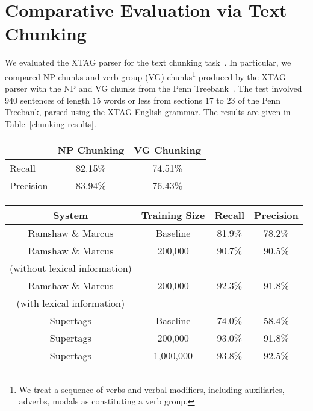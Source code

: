 \section{Comparative Evaluation via Text Chunking}

We evaluated the XTAG parser for the text chunking
task~\cite{abney91}. In particular, we compared NP chunks and verb
group (VG) chunks\footnote{We treat a sequence of verbs and verbal
  modifiers, including auxiliaries, adverbs, modals as constituting a
  verb group.}  produced by the XTAG parser with the NP and VG chunks
from the Penn Treebank~\cite{marcus93}. The test involved $940$
sentences of length $15$ words or less from sections $17$ to $23$ of
the Penn Treebank, parsed using the XTAG English grammar. The results
are given in Table~\ref{chunking-results}.

\begin{table*}[htb]
\centering
\begin{tabular}{|l|c|c|}
\hline
& NP Chunking & VG Chunking \\ \hline
Recall & 82.15\% & 74.51\% \\ \hline
Precision & 83.94\%  & 76.43\% \\ \hline
\end{tabular}
\caption{Text Chunking performance of the XTAG parser}
\label{chunking-results}
\end{table*} 

\begin{table*}[htb]
\centering
\begin{tabular}{|c|c|c|c|} \hline
System & Training Size & Recall & Precision  \\ \hline \hline
Ramshaw \& Marcus & Baseline & 81.9\% & 78.2\% \\ \hline
Ramshaw \& Marcus & 200,000 & 90.7\% & 90.5\% \\ 
(without lexical information) & & & \\ \hline 
Ramshaw \& Marcus & 200,000 & 92.3\% & 91.8\% \\ 
(with lexical information) & & & \\ \hline \hline
Supertags & Baseline & 74.0\% & 58.4\% \\ \hline
Supertags & 200,000 & 93.0\% & 91.8\% \\ \hline
Supertags & 1,000,000 & 93.8\% & 92.5\% \\ \hline
\end{tabular}
\caption{Performance comparison of the transformation based noun
chunker and the supertag based noun chunker}
\label{nc-compare}
\end{table*}

